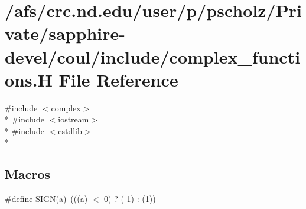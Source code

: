 \hypertarget{complex__functions_8H}{\section{/afs/crc.nd.\-edu/user/p/pscholz/\-Private/sapphire-\/devel/coul/include/complex\-\_\-functions.H File Reference}
\label{complex__functions_8H}
}
{\ttfamily \#include $<$complex$>$}\\*
{\ttfamily \#include $<$iostream$>$}\\*
{\ttfamily \#include $<$cstdlib$>$}\\*
\subsection*{Macros}
\begin{DoxyCompactItemize}
\item 
\#define \hyperlink{complex__functions_8H_a8c4a9e5e4622948245de4ec0b5d38329}{S\-I\-G\-N}(a)~(((a) $<$ 0) ? (-\/1) \-: (1))
\end{DoxyCompactItemize}
